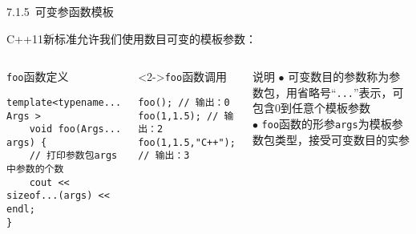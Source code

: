 \begin{frame}[fragile]{7.1.5~可变参函数模板}

C++11新标准允许我们使用\alert{数目可变}的模板参数：

\vspace{-4mm}

\begin{columns}[t]

\begin{blueblock}{\texttt{foo}函数定义}
\begin{lstlisting}[moreemph={T}]
template<typename... Args >
    void foo(Args... args) {
    // 打印参数包args中参数的个数
    cout << sizeof...(args) << endl;
}
\end{lstlisting}
\end{blueblock}
\begin{blueblock}<2->{\texttt{foo}函数调用}
\begin{lstlisting}[moreemph={T}]
foo(); // 输出：0
foo(1,1.5); // 输出：2
foo(1,1.5,"C++"); // 输出：3
\end{lstlisting}
\end{blueblock}

\begin{yellowblock}{说明}
$\bullet$ 可变数目的参数称为\alert{参数包}，用省略号“\alert{\texttt{...}}”表示，可包含0到任意个模板参数\\
$\bullet$ \texttt{foo}函数的形参\texttt{args}为模板参数包类型，接受可变数目的实参
\end{yellowblock}

\end{columns}

\end{frame}

